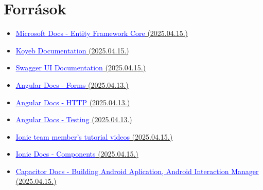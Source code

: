 \documentclass[12pt]{report}
\begin{document}
\begin{figure}[H]
\end{figure}

\chapter{Források}
\begin{itemize}
  \item \href{https://learn.microsoft.com/en-us/ef/core/}{\textcolor{blue}{\underline{Microsoft Docs - Entity Framework Core}}{ (2025.04.15.)}}
  \item \href{https://www.koyeb.com/docs}{\textcolor{blue}{\underline{Koyeb Documentation}}{ (2025.04.15.)}}
  \item \href{https://swagger.io/docs/open-source-tools/swagger-ui/usage/installation/}{\textcolor{blue}{\underline{Swagger UI Documentation}}{ (2025.04.15.)}}
  \item \href{https://angular.dev/guide/forms}{\textcolor{blue}{\underline{Angular Docs - Forms}}{ (2025.04.13.)}}
  \item \href{https://angular.dev/guide/http}{\textcolor{blue}{\underline{Angular Docs - HTTP}}{ (2025.04.13.)}}
  \item \href{https://angular.dev/guide/testing}{\textcolor{blue}{\underline{Angular Docs - Testing}}{ (2025.04.13.)}}
  \item \href{https://www.youtube.com/@galaxies_dev}{\textcolor{blue}{\underline{Ionic team member's tutorial videos}}{ (2025.04.15.)}}
  \item \href{https://ionicframework.com/docs/components}{\textcolor{blue}{\underline{Ionic Docs - Components}}{ (2025.04.15.)}}
  \item \href{https://capacitorjs.com/docs}{\textcolor{blue}{\underline{Capacitor Docs - Building Android Aplication, Android Interaction Manager}}{ (2025.04.15.)}}
\end{itemize}
\end{document}
